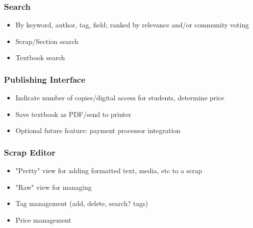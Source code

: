 \documentclass[letterpaper, 10pt, draftclsnofoot, compsoc, onecolumn]{IEEEtran}
\begin{document}
{{{\subsubsection[System feature 4: Search Feature]{\rmfamily\bfseries\color{black} Search
}
\begin{itemize}
\item By keyword, author, tag, field; ranked by relevance and/or community voting
\item Scrap/Section search
\item Textbook search
\end{itemize}

\subsubsection[System feature 5: Publishing Interface]{\rmfamily\bfseries\color{black} Publishing Interface
}
\begin{itemize}
\item Indicate number of copies/digital access for students, determine price
\item Save textbook as PDF/send to printer
\item Optional future feature: payment processor integration
\end{itemize}

\subsubsection[System feature 6: Scrap Editor]{\rmfamily\bfseries\color{black} Scrap Editor}
\begin{itemize}
\item "Pretty" view for adding formatted text, media, etc to a scrap
\item "Raw" view for managing
\item Tag management (add, delete, search? tags)
\item Price management
\end{itemize}

\bigskip

}}}
\end{document}
